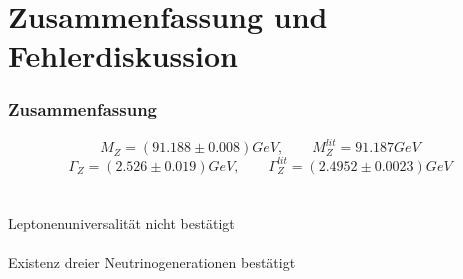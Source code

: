 \section{Zusammenfassung und Fehlerdiskussion}
\begin{frame}
	\frametitle{Zusammenfassung}
	\begin{equation*}
		M_Z=(91.188\pm0.008)\unit{GeV},\qquad M_Z^{lit}=91.187\unit{GeV}
	\end{equation*}
	\mbox{}
	\begin{equation*}
		\Gamma_Z=(2.526\pm0.019)\unit{GeV},\qquad \Gamma_Z^{lit}=(2.4952\pm0.0023)\unit{GeV}
	\end{equation*}\\
	\hfill\\
	\hspace{3cm}Leptonenuniversalität nicht bestätigt\\
	\hfill\\
	\hspace{2.5cm}Existenz dreier Neutrinogenerationen bestätigt
\end{frame}